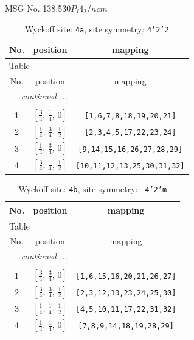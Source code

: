 \documentclass[fleqn,8pt]{jsarticle}
\begin{document}
\setcounter{MaxMatrixCols}{32}

\renewcommand{\tablename}{Table~}
\renewcommand{\figurename}{Figure~}
\begin{center}
\LARGE
MSG No. 138.530\quad$P_{I}4_{2}/ncm$
\end{center}
\renewcommand{\arraystretch}{1.2}
\begin{longtable}{ccc}
\caption{Wyckoff site: {\tt 4a}, site symmetry: {\tt 4'2'2}}
 \\
 \hline \hline
No. & position & mapping \\ \hline \endfirsthead

\multicolumn{2}{l}{\tablename\ \thetable{}} \\
 \hline \hline
No. & position & mapping \\ \hline \endhead

 \hline \hline
\multicolumn{2}{r}{\footnotesize\it continued ...} \\ \endfoot

 \hline \hline
\multicolumn{2}{r}{} \\ \endlastfoot

1 & $\left[ \frac{3}{4},\, \frac{1}{4},\, 0 \right]$ & {\tt [1,6,7,8,18,19,20,21]} \\ \hline
2 & $\left[ \frac{1}{4},\, \frac{3}{4},\, \frac{1}{2} \right]$ & {\tt [2,3,4,5,17,22,23,24]} \\ \hline
3 & $\left[ \frac{1}{4},\, \frac{3}{4},\, 0 \right]$ & {\tt [9,14,15,16,26,27,28,29]} \\ \hline
4 & $\left[ \frac{3}{4},\, \frac{1}{4},\, \frac{1}{2} \right]$ & {\tt [10,11,12,13,25,30,31,32]} \\
\end{longtable}
\renewcommand{\arraystretch}{1.2}
\begin{longtable}{ccc}
\caption{Wyckoff site: {\tt 4b}, site symmetry: {\tt -4'2'm}}
 \\
 \hline \hline
No. & position & mapping \\ \hline \endfirsthead

\multicolumn{2}{l}{\tablename\ \thetable{}} \\
 \hline \hline
No. & position & mapping \\ \hline \endhead

 \hline \hline
\multicolumn{2}{r}{\footnotesize\it continued ...} \\ \endfoot

 \hline \hline
\multicolumn{2}{r}{} \\ \endlastfoot

1 & $\left[ \frac{3}{4},\, \frac{3}{4},\, 0 \right]$ & {\tt [1,6,15,16,20,21,26,27]} \\ \hline
2 & $\left[ \frac{3}{4},\, \frac{3}{4},\, \frac{1}{2} \right]$ & {\tt [2,3,12,13,23,24,25,30]} \\ \hline
3 & $\left[ \frac{1}{4},\, \frac{1}{4},\, \frac{1}{2} \right]$ & {\tt [4,5,10,11,17,22,31,32]} \\ \hline
4 & $\left[ \frac{1}{4},\, \frac{1}{4},\, 0 \right]$ & {\tt [7,8,9,14,18,19,28,29]} \\
\end{longtable}
\end{document}
